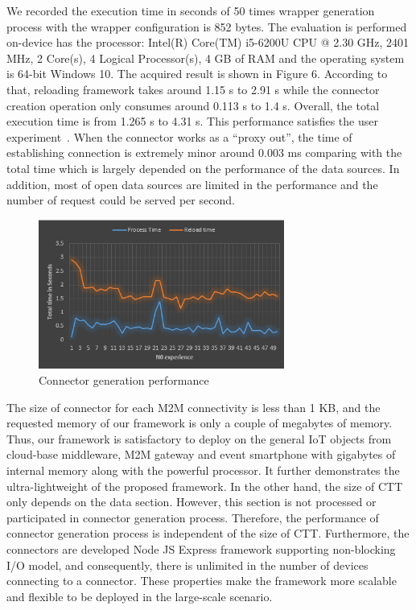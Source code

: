 We recorded the execution time in seconds of 50 times wrapper generation process with the wrapper configuration is 852 bytes. The evaluation is performed on-device has the processor: Intel(R) Core(TM) i5-6200U CPU @ 2.30 GHz, 2401 MHz, 2 Core(s), 4 Logical Processor(s), 4 GB of RAM and the operating system is 64-bit Windows 10. The acquired result is shown in Figure 6. According to that, reloading framework takes around 1.15 s to 2.91 s while the connector creation operation only consumes around 0.113 s to 1.4 s. Overall, the total execution time is from 1.265 s to 4.31 s. This performance satisfies the user experiment~\cite{rosson2002usability}. When the connector works as a “proxy out”, the time of establishing connection is extremely minor around 0.003 ms comparing with the total time which is largely depended on the performance of the data sources. In addition, most of open data sources are limited in the performance and the number of request could be served per second. \\

\begin{figure}[h!] 
 \begin{center} 
 \includegraphics[width=0.72\textwidth]{./Part2/Chapter4/figures/connector_performance.png} 
    \caption{Connector generation performance}
     \label{fig:c4_connector_performance}
  \end{center} 
\end{figure}

The size of connector for each M2M connectivity is less than 1 KB, and the requested memory of our framework is only a couple of megabytes of memory. Thus, our framework is satisfactory to deploy on the general IoT objects from cloud-base middleware, M2M gateway and event smartphone with gigabytes of internal memory along with the powerful processor. It further demonstrates the ultra-lightweight of the proposed framework. In the other hand, the size of CTT only depends on the data section. However, this section is not processed or participated in connector generation process. Therefore, the performance of connector generation process is independent of the size of CTT. Furthermore, the connectors are developed Node JS Express framework  supporting non-blocking I/O model, and consequently, there is unlimited in the number of devices connecting to a connector. These properties make the framework more scalable and flexible to be deployed in the large-scale scenario.

